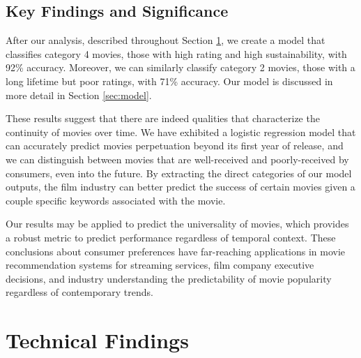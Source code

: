 \documentclass[12pt]{article}
\begin{document}
\subsection{Key Findings and Significance}

After our analysis, described throughout Section \ref{sec:technical}, we create a model that classifies category 4 movies, those with high rating and high sustainability, with 92\% accuracy. Moreover, we can similarly classify category 2 movies, those with a long lifetime but poor ratings, with 71\% accuracy. Our model is discussed in more detail in Section \ref{sec:model}.

These results suggest that there are indeed qualities that characterize the continuity of movies over time. We have exhibited a logistic regression model that can accurately predict movies perpetuation beyond its first year of release, and we can distinguish between movies that are well-received and poorly-received by consumers, even into the future. By extracting the direct categories of our model outputs, the film industry can better predict the success of certain movies given a couple specific keywords associated with the movie. 

Our results may be applied to predict the universality of movies, which provides a robust metric to predict performance regardless of temporal context. These conclusions about consumer preferences have far-reaching applications in movie recommendation systems for streaming services, film company executive decisions, and industry understanding the predictability of movie popularity regardless of contemporary trends.

\newpage

\section{Technical Findings}
\label{sec:technical}

\end{document}
